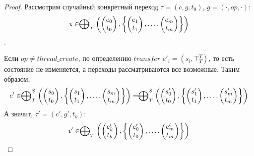 \begin{proof}
Рассмотрим случайный конкретный переход $\tau = (c, g, t_0)$, $g=(\cdot, op, \cdot)$:
$$\uptau \in  \mathrel{\bigoplus}_{T}
\left(
\begin{pmatrix}
e_0 \\
t_0 
\end{pmatrix},
\left\{
\begin{pmatrix}
e_1 \\
t_1 
\end{pmatrix},
\dots ,
\begin{pmatrix}
e_m \\
t_m 
\end{pmatrix}
\right\}
\right)$$.

Если $op \neq thread\_create$, по определению $transfer$ $e'_i = (s_i, \top^T_T)$, то есть состояние не изменяется, а переходы рассматриваются все возможные. 
Таким образом, 
$$c' \in  \mathrel{\bigoplus}^S_{T}
\left(
\begin{pmatrix}
s_0 \\
t_0 
\end{pmatrix},
\left\{
\begin{pmatrix}
s_1 \\
t_1 
\end{pmatrix},
\dots ,
\begin{pmatrix}
s_m \\
t_m 
\end{pmatrix}
\right\}
\right) = \mathrel{\bigoplus}^S_{T}
\left(
\begin{pmatrix}
s'_0 \\
t_0 
\end{pmatrix},
\left\{
\begin{pmatrix}
s'_1 \\
t_1 
\end{pmatrix},
\dots ,
\begin{pmatrix}
s'_m \\
t_m 
\end{pmatrix}
\right\}
\right)$$
А значит, $\tau' = (c', g', t_k)$:
$$\uptau'  \in \mathrel{\bigoplus}_{T}
\left(
\begin{pmatrix}
e'_k \\
t_k 
\end{pmatrix},
\left\{
\begin{pmatrix}
e'_0 \\
t_0 
\end{pmatrix},
\dots ,
\begin{pmatrix}
e'_m \\
t_m 
\end{pmatrix}
\right\}
\right)$$


\end{proof}
